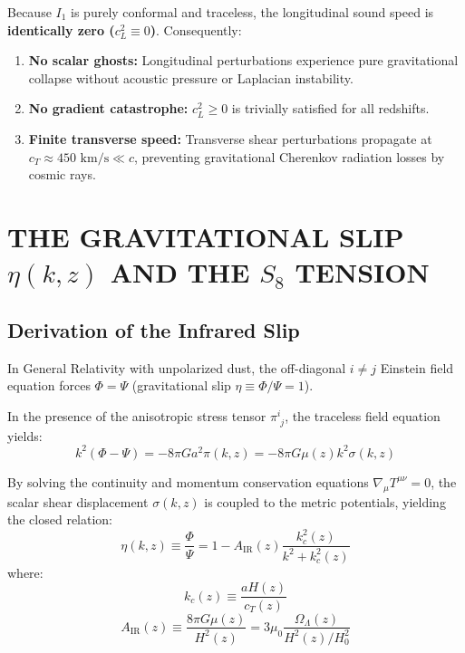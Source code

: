 \documentclass[10pt,twocolumn]{article}
\begin{document}
Because $I_1$ is purely conformal and traceless, the longitudinal sound speed is \textbf{identically zero ($c_L^2 \equiv 0$)}. Consequently:
\begin{enumerate}
  \item \textbf{No scalar ghosts:} Longitudinal perturbations experience pure gravitational collapse without acoustic pressure or Laplacian instability.
  \item \textbf{No gradient catastrophe:} $c_L^2 \ge 0$ is trivially satisfied for all redshifts.
  \item \textbf{Finite transverse speed:} Transverse shear perturbations propagate at $c_T \approx 450\text{ km/s} \ll c$, preventing gravitational Cherenkov radiation losses by cosmic rays.
\end{enumerate}



\section{THE GRAVITATIONAL SLIP $\eta(k,z)$ AND THE $S_8$ TENSION}


\subsection{Derivation of the Infrared Slip}

In General Relativity with unpolarized dust, the off-diagonal $i \ne j$ Einstein field equation forces $\Phi = \Psi$ (gravitational slip $\eta \equiv \Phi / \Psi = 1$).

In the presence of the anisotropic stress tensor $\pi^i_{\phantom{i}j}$, the traceless field equation yields:
\begin{equation}
  k^2 (\Phi - \Psi) = -8\pi G a^2 \pi(k,z) = -8\pi G \mu(z) k^2 \sigma(k,z)
\end{equation}

By solving the continuity and momentum conservation equations $\nabla_\mu T^{\mu\nu} = 0$, the scalar shear displacement $\sigma(k,z)$ is coupled to the metric potentials, yielding the closed relation:
\begin{equation}
  \eta(k,z) \equiv \frac{\Phi}{\Psi} = 1 - A_{\text{IR}}(z) \frac{k_c^2(z)}{k^2 + k_c^2(z)}
\end{equation}
where:
\begin{equation}
  k_c(z) \equiv \frac{a H(z)}{c_T(z)}
\end{equation}
\begin{equation}
  A_{\text{IR}}(z) \equiv \frac{8\pi G \mu(z)}{H^2(z)} = 3 \mu_0 \frac{\Omega_\Lambda(z)}{H^2(z) / H_0^2}
\end{equation}
\end{document}
